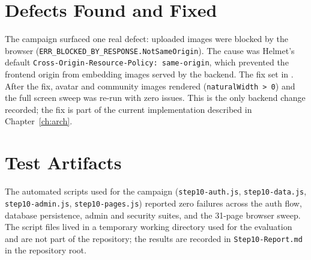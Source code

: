 \section{Defects Found and Fixed}

The campaign surfaced one real defect: uploaded images were blocked by the
browser (\texttt{ERR\_BLOCKED\_BY\_RESPONSE.NotSameOrigin}). The cause was
Helmet's default \texttt{Cross-Origin-Resource-Policy: same-origin}, which
prevented the frontend origin from embedding images served by the backend.
The fix set  in
. After the fix, avatar and
community images rendered (\texttt{naturalWidth > 0}) and the full screen sweep
was re-run with zero issues. This is the only backend change recorded; the fix
is part of the current implementation described in Chapter~\ref{ch:arch}.

\section{Test Artifacts}

The automated scripts used for the campaign (\texttt{step10-auth.js},
\texttt{step10-data.js}, \texttt{step10-admin.js}, \texttt{step10-pages.js})
reported zero failures across the auth flow, database persistence, admin and
security suites, and the 31-page browser sweep. The script files lived in a
temporary working directory used for the evaluation and are not part of the
repository; the results are recorded in \texttt{Step10-Report.md} in the
repository root.